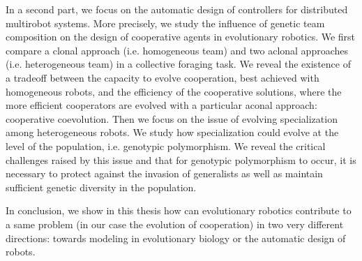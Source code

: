 	In a second part, we focus on the automatic design of controllers for distributed multirobot systems. More precisely, we study the influence of genetic team composition on the design of cooperative agents in evolutionary robotics. We first compare a clonal approach (i.e. homogeneous team) and two aclonal approaches (i.e. heterogeneous team) in a collective foraging task. We reveal the existence of a tradeoff between the capacity to evolve cooperation, best achieved with homogeneous robots, and the efficiency of the cooperative solutions, where the more efficient cooperators are evolved with a particular aconal approach: cooperative coevolution. Then we focus on the issue of evolving specialization among heterogeneous robots. We study how specialization could evolve at the level of the population, i.e. genotypic polymorphism. We reveal the critical challenges raised by this issue and that for genotypic polymorphism to occur, it is necessary to protect against the invasion of generalists as well as maintain sufficient genetic diversity in the population.

	In conclusion, we show in this thesis how can evolutionary robotics contribute to a same problem (in our case the evolution of cooperation) in two very different directions: towards modeling in evolutionary biology or the automatic design of robots.